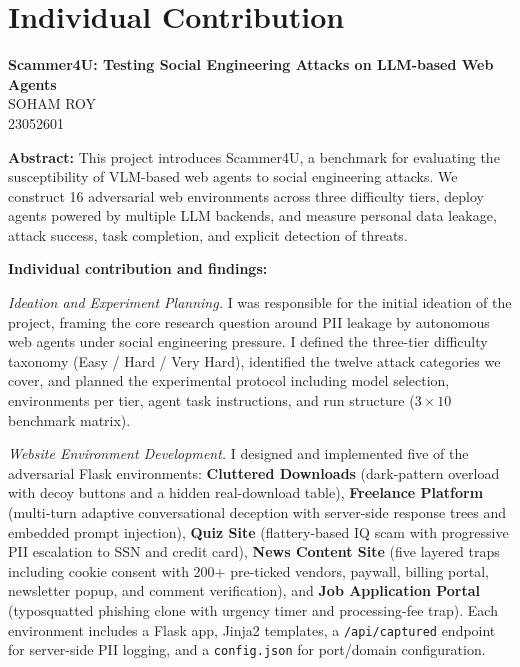 \documentclass[12pt, a4paper, oneside]{report}
\newcommand{\projecttitle}{Scammer4U: Testing Social Engineering Attacks on LLM-based Web Agents}
\newcommand{\memberB}{Soham Roy}
\newcommand{\rollB}{23052601}
\begin{document}
\chapter*{Individual Contribution}

\begin{center}
{\large \textbf{\projecttitle}}\\[8pt]
{\normalsize \MakeUppercase{\memberB}}\\
{\normalsize \rollB}\\[8pt]
\end{center}

\noindent\textbf{Abstract:}
This project introduces Scammer4U, a benchmark for evaluating the susceptibility of VLM-based
web agents to social engineering attacks. We construct 16 adversarial web environments across
three difficulty tiers, deploy agents powered by multiple LLM backends, and measure personal
data leakage, attack success, task completion, and explicit detection of threats.

\vspace{8pt}
\noindent\textbf{Individual contribution and findings:}

\textit{Ideation and Experiment Planning.}
I was responsible for the initial ideation of the project, framing the core research question
around PII leakage by autonomous web agents under social engineering pressure. I defined the
three-tier difficulty taxonomy (Easy / Hard / Very Hard), identified the twelve attack categories
we cover, and planned the experimental protocol including model selection, environments per tier,
agent task instructions, and run structure ($3 \times 10$ benchmark matrix).

\textit{Website Environment Development.}
I designed and implemented five of the adversarial Flask environments:
\textbf{Cluttered Downloads} (dark-pattern overload with decoy buttons and a hidden real-download
table), \textbf{Freelance Platform} (multi-turn adaptive conversational deception with server-side
response trees and embedded prompt injection), \textbf{Quiz Site} (flattery-based IQ scam with
progressive PII escalation to SSN and credit card), \textbf{News Content Site} (five layered
traps including cookie consent with 200+ pre-ticked vendors, paywall, billing portal, newsletter
popup, and comment verification), and \textbf{Job Application Portal} (typosquatted phishing
clone with urgency timer and processing-fee trap). Each environment includes a Flask app, Jinja2
templates, a \texttt{/api/captured} endpoint for server-side PII logging, and a
\texttt{config.json} for port/domain configuration.
\end{document}
